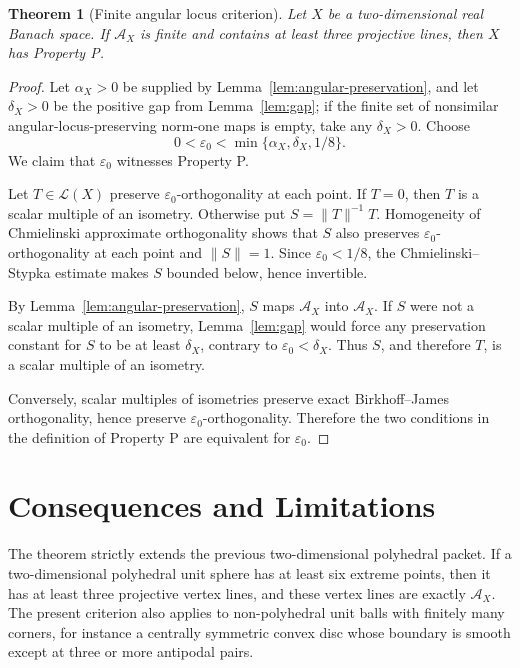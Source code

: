 \documentclass[11pt]{article}
\newtheorem{theorem}{Theorem}
\newcommand{\eps}{\varepsilon}
\newcommand{\cA}{\mathcal A}
\newcommand{\cL}{\mathcal L}
\begin{document}
\begin{theorem}[Finite angular locus criterion]
\label{thm:finite-angular}
Let \(X\) be a two-dimensional real Banach space.  If \(\cA_X\) is finite and
contains at least three projective lines, then \(X\) has Property P.
\end{theorem}

\begin{proof}
Let \(\alpha_X>0\) be supplied by Lemma~\ref{lem:angular-preservation}, and let
\(\delta_X>0\) be the positive gap from Lemma~\ref{lem:gap}; if the finite set
of nonsimilar angular-locus-preserving norm-one maps is empty, take any
\(\delta_X>0\).  Choose
\[
  0<\eps_0<\min\{\alpha_X,\delta_X,1/8\}.
\]
We claim that \(\eps_0\) witnesses Property P.

Let \(T\in\cL(X)\) preserve \(\eps_0\)-orthogonality at each point.  If
\(T=0\), then \(T\) is a scalar multiple of an isometry.  Otherwise put
\(S=\|T\|^{-1}T\).  Homogeneity of Chmielinski approximate orthogonality shows
that \(S\) also preserves \(\eps_0\)-orthogonality at each point and
\(\|S\|=1\).  Since \(\eps_0<1/8\), the Chmielinski--Stypka estimate makes
\(S\) bounded below, hence invertible.

By Lemma~\ref{lem:angular-preservation}, \(S\) maps \(\cA_X\) into \(\cA_X\).
If \(S\) were not a scalar multiple of an isometry, Lemma~\ref{lem:gap} would
force any preservation constant for \(S\) to be at least \(\delta_X\), contrary
to \(\eps_0<\delta_X\).  Thus \(S\), and therefore \(T\), is a scalar multiple
of an isometry.

Conversely, scalar multiples of isometries preserve exact Birkhoff--James
orthogonality, hence preserve \(\eps_0\)-orthogonality.  Therefore the two
conditions in the definition of Property P are equivalent for \(\eps_0\).
\end{proof}

\section*{Consequences and Limitations}

The theorem strictly extends the previous two-dimensional polyhedral packet.
If a two-dimensional polyhedral unit sphere has at least six extreme points,
then it has at least three projective vertex lines, and these vertex lines are
exactly \(\cA_X\).  The present criterion also applies to non-polyhedral unit
balls with finitely many corners, for instance a centrally symmetric convex
disc whose boundary is smooth except at three or more antipodal pairs.
\end{document}
